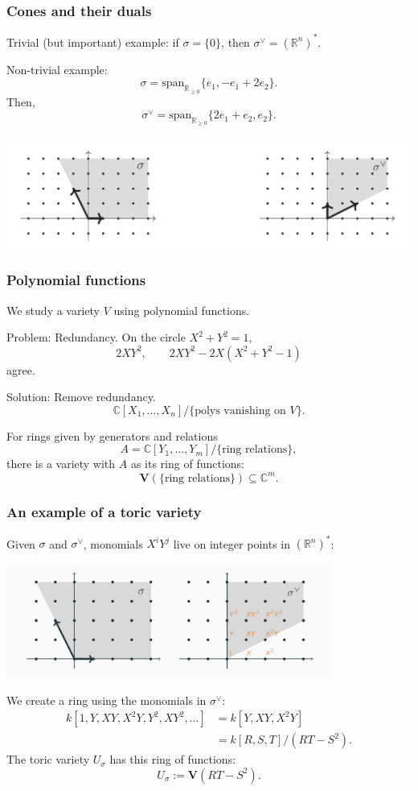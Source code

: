 \documentclass{beamer}
\theoremstyle{definition}
\theoremstyle{definition}
\begin{document}
\begin{frame}
\frametitle{Cones and their duals}
Trivial (but important) example:
if $\sigma = \{0\}$, then $\sigma^\vee = (\mathbb{R}^n)^*$.

Non-trivial example: 
$$\sigma = \mathrm{span}_{\mathbb{R}_{\ge 0}}\{e_1, -e_1 + 2 e_2\}.$$
Then,
$$\sigma^\vee = \mathrm{span}_{\mathbb{R}_{\ge 0}}\{2 e_1 + e_2, e_2\}.$$
\centerline{\includegraphics[width=\textwidth]{cone_and_dual}}
\end{frame}

\begin{frame}
\frametitle{Polynomial functions}
We study a variety $V$ using polynomial functions.

Problem: Redundancy.
On the circle $X^2 + Y^2 = 1$, 
$$2 X Y^2, \qquad 2 X Y^2 - 2X (X^2+Y^2-1)$$
agree.

Solution: Remove redundancy.
$$\mathbb{C}[X_1, \ldots, X_n] / \{\text{polys vanishing on $V$}\}.$$

For rings given by generators and relations
$$A = \mathbb{C}[Y_1, \ldots, Y_m]/\{\text{ring relations}\},$$
there is a variety with $A$ as its ring of functions:
$$\mathbf{V}(\{\text{ring relations}\}) \subseteq \mathbb{C}^m.$$

\end{frame}

\begin{frame}
\frametitle{An example of a toric variety}
Given $\sigma$ and $\sigma^\vee$, monomials $X^i Y^j$ live on integer points in $(\mathbb{R}^n)^*$:

\centerline{\includegraphics[width=0.8\textwidth]{cone_and_dual_with_monomials}}

We create a ring using the monomials in $\sigma^\vee$:
\begin{align*}
	k[1, Y, XY, X^2Y, Y^2, XY^2, \ldots] &= k[Y, XY, X^2Y] \\
	&= k[R, S, T]/(RT - S^2).
\end{align*}
The toric variety $U_\sigma$ has this ring of functions:
$$U_\sigma := \mathbf{V}(RT - S^2).$$
\end{frame}
\end{document}
